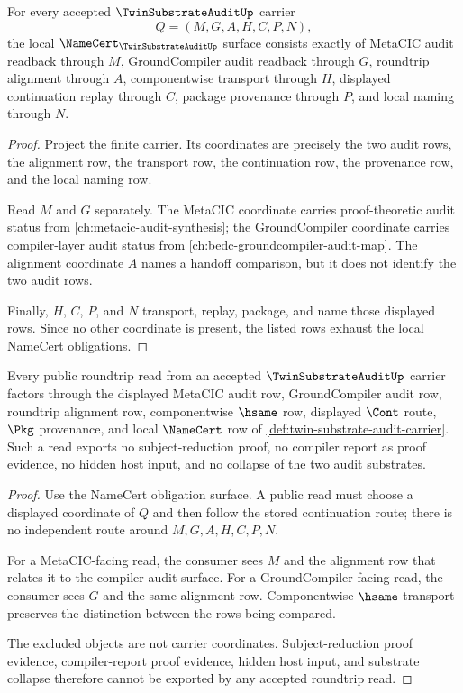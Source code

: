 \begin{theorem}
\label{thm:twin-substrate-audit-namecert-obligations}
For every accepted $\TwinSubstrateAuditUp$ carrier
$$
Q=(M,G,A,H,C,P,N),
$$
the local $\NameCert_{\TwinSubstrateAuditUp}$ surface consists exactly of MetaCIC audit readback through $M$, GroundCompiler audit readback through $G$, roundtrip alignment through $A$, componentwise transport through $H$, displayed continuation replay through $C$, package provenance through $P$, and local naming through $N$.
\end{theorem}
\begin{proof}
Project the finite carrier. Its coordinates are precisely the two audit rows, the alignment row, the transport row, the continuation row, the provenance row, and the local naming row.

Read $M$ and $G$ separately. The MetaCIC coordinate carries proof-theoretic audit status from \autoref{ch:metacic-audit-synthesis}; the GroundCompiler coordinate carries compiler-layer audit status from \autoref{ch:bedc-groundcompiler-audit-map}. The alignment coordinate $A$ names a handoff comparison, but it does not identify the two audit rows.

Finally, $H$, $C$, $P$, and $N$ transport, replay, package, and name those displayed rows. Since no other coordinate is present, the listed rows exhaust the local NameCert obligations.
\end{proof}

\begin{theorem}
\label{thm:twin-substrate-audit-roundtrip-nonescape}
Every public roundtrip read from an accepted $\TwinSubstrateAuditUp$ carrier factors through the displayed MetaCIC audit row, GroundCompiler audit row, roundtrip alignment row, componentwise $\hsame$ row, displayed $\Cont$ route, $\Pkg$ provenance, and local $\NameCert$ row of \autoref{def:twin-substrate-audit-carrier}. Such a read exports no subject-reduction proof, no compiler report as proof evidence, no hidden host input, and no collapse of the two audit substrates.
\end{theorem}
\begin{proof}
Use the NameCert obligation surface. A public read must choose a displayed coordinate of $Q$ and then follow the stored continuation route; there is no independent route around $M,G,A,H,C,P,N$.

For a MetaCIC-facing read, the consumer sees $M$ and the alignment row that relates it to the compiler audit surface. For a GroundCompiler-facing read, the consumer sees $G$ and the same alignment row. Componentwise $\hsame$ transport preserves the distinction between the rows being compared.

The excluded objects are not carrier coordinates. Subject-reduction proof evidence, compiler-report proof evidence, hidden host input, and substrate collapse therefore cannot be exported by any accepted roundtrip read.
\end{proof}

